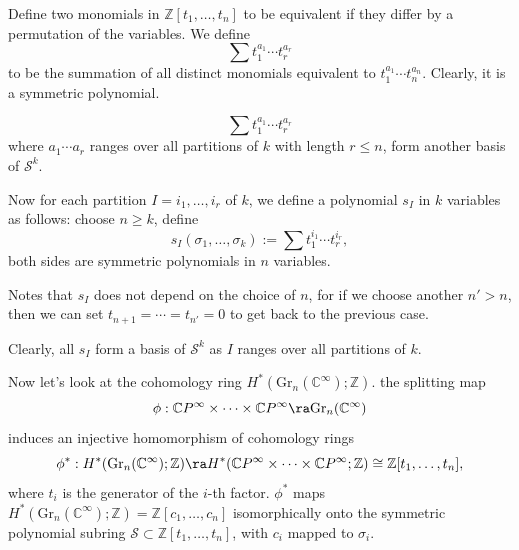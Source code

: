 Define two monomials in $\mathbb{Z}[t_1,\dots,t_n]$ to be 
equivalent if they differ by a permutation of the variables.
We define 
\begin{equation*}
    \sum t_1^{a_1}\cdots t_r^{a_r}
\end{equation*}
to be the summation of all distinct monomials equivalent to
$t_1^{a_1}\cdots t_n^{a_n}$. Clearly, it is a symmetric polynomial.

\begin{lemma}
    \begin{equation*}
        \sum t_1^{a_1}\cdots t_r^{a_r}
    \end{equation*}
    where $a_1\cdots a_r$ ranges over all partitions 
    of $k$ with length $r\leq n$,
    form another basis of $\mathcal{S}^k$.
\end{lemma}

Now for each partition $I=i_1,\dots,i_r$ of $k$, 
we define a polynomial $s_I$ in $k$ variables as follows:
choose $n\geq k$, define 
\begin{equation*}
    s_I(\sigma_1,\dots,\sigma_k)
    :=\sum t_1^{i_1}\cdots t_r^{i_r},
\end{equation*}
both sides are symmetric polynomials in $n$ variables.

Notes that $s_I$ does not depend on the choice of $n$, 
for if we choose another $n'>n$, 
then we can set $t_{n+1}=\cdots=t_{n'}=0$ to get back to the previous case.

Clearly, all $s_I$ form a basis of $\mathcal{S}^k$ as $I$ ranges over
all partitions of $k$.

Now let's look at the cohomology ring 
$H^*(\mathrm{Gr}_n(\mathbb{C}^\infty);\mathbb{Z})$.
the splitting map 
\begin{equation*}
    \phi:\mathbb{C}P^\infty\times\cdots\times\mathbb{C}P^\infty
    \ra \mathrm{Gr}_n(\mathbb{C}^\infty)
\end{equation*}
induces an injective homomorphism of cohomology rings
\begin{equation*}
    \phi^*:H^*(\mathrm{Gr}_n(\mathbb{C}^\infty);\mathbb{Z})
    \ra H^*(\mathbb{C}P^\infty\times\cdots\times\mathbb{C}P^\infty;
    \mathbb{Z})
    \cong \mathbb{Z}[t_1,\dots,t_n],
\end{equation*}
where $t_i$ is the generator of the $i$-th factor.
$\phi^*$ maps 
$H^*(\mathrm{Gr}_n(\mathbb{C}^\infty);\mathbb{Z})=\mathbb{Z}[c_1,\dots,c_n]$ 
isomorphically onto the symmetric polynomial subring 
$\mathcal{S}\subset\mathbb{Z}[t_1,\dots,t_n]$, 
with $c_i$ mapped to $\sigma_i$.

